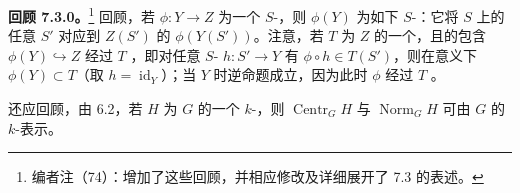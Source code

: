 \textbf{回顾 7.3.0。}\footnote{编者注（74）：增加了这些回顾，并相应修改及详细展开了 7.3 的表述。}
回顾，若 $\phi:Y\to Z$ 为一个 $S$-，则 $\phi(Y)$ 为如下 $S$-：它将 $S$ 上的任意 $S'$ 对应到 $Z(S')$ 的 $\phi(Y(S'))$。注意，若 $T$ 为 $Z$ 的一个，且的包含 $\phi(Y)\hookrightarrow Z$ 经过 $T$ ，即对任意 $S$- $h:S'\to Y$ 有 $\phi\circ h\in T(S')$，则在意义下 $\phi(Y)\subset T$（取 $h=\operatorname{id}_Y$）；当 $Y$ 时逆命题成立，因为此时 $\phi$ 经过 $T$ 。

还应回顾，由 6.2，若 $H$ 为 $G$ 的一个 $k$-，则 $\operatorname{Centr}_G H$ 与 $\operatorname{Norm}_G H$ 可由 $G$ 的 $k$-表示。

